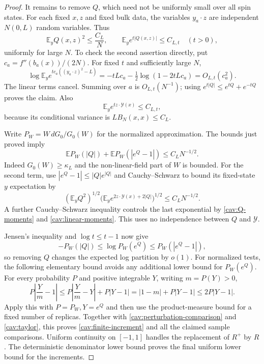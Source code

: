 \begin{proof}
It remains to remove $Q$, which need not be uniformly small over all
spin states.  For each fixed $x,z$ and fixed bulk data, the variables
$y_a\cdot z$ are independent $N(0,L)$ random variables.  Thus
\begin{equation}\label{cav:Q-moments}
 \mathbb E_y Q(x,z)^2\le\frac{C_L}{N},\qquad
 \mathbb E_y e^{t|Q(x,z)|}\le C_{L,t}\quad(t>0),
\end{equation}
uniformly for large $N$.  To check the second assertion directly, put
$c_a=f''(b_a(x))/(2N)$.  For fixed $t$ and sufficiently large $N$,
\[
 \log\mathbb E_y e^{t c_a((y_a\cdot z)^2-L)}
 =-tLc_a-\tfrac12\log(1-2tLc_a)=O_{L,t}(c_a^2).
\]
The linear terms cancel.  Summing over $a$ is $O_{L,t}(N^{-1})$;
using $e^{t|Q|}\le e^{tQ}+e^{-tQ}$ proves the claim.  Also
\begin{equation}\label{cav:linear-moments}
 \mathbb E_y e^{t z\cdot\mathcal Y(x)}\le C_{L,t},
\end{equation}
because its conditional variance is $LB_N(x,x)\le C_L$.

Write $P_W=W\,dG_0/G_0(W)$ for the normalized approximation.  The
bounds just proved imply
\begin{equation}\label{cav:Q-under-tilt}
 \mathbb E P_W(|Q|)+\mathbb E P_W(|e^Q-1|)
 \le C_LN^{-1/2}.
\end{equation}
Indeed $G_0(W)\ge\kappa_L$ and the non-linear-field part of $W$ is
bounded.  For the second term, use $|e^Q-1|\le|Q|e^{|Q|}$ and
Cauchy--Schwarz to bound its fixed-state $y$ expectation by
\[
 (\mathbb E_yQ^2)^{1/2}
 \bigl(\mathbb E_y e^{2z\cdot\mathcal Y(x)+2|Q|}\bigr)^{1/2}
 \le C_LN^{-1/2}.
\]
A further Cauchy--Schwarz inequality controls the last exponential by
\eqref{cav:Q-moments} and \eqref{cav:linear-moments}.  This uses no
independence between $Q$ and $\mathcal Y$.

Jensen's inequality and $\log t\le t-1$ now give
\[
 -P_W(|Q|)\le\log P_W(e^Q)\le P_W(|e^Q-1|),
\]
so removing $Q$ changes the expected log partition by $o(1)$.
For normalized tests, the following elementary bound avoids any
additional lower bound for $P_W(e^Q)$.  For every probability $P$ and
positive integrable $Y$, writing $m=P(Y)>0$,
\begin{equation}\label{cav:normalized-comparison}
 P\left|\frac Ym-1\right|
 \le P\left|\frac Ym-Y\right|+P|Y-1|
 =|1-m|+P|Y-1|\le2P|Y-1|.
\end{equation}
Apply this with $P=P_W,Y=e^Q$ and then use the product-measure bound
for a fixed number of replicas.  Together with
\eqref{cav:perturbation-comparison} and \eqref{cav:taylor}, this proves
\eqref{cav:finite-increment} and all the claimed sample comparisons.
Uniform continuity on $[-1,1]$ handles the replacement of $R^+$ by $R$.
The deterministic denominator lower bound proves the final uniform
lower bound for the increments.
\end{proof}

